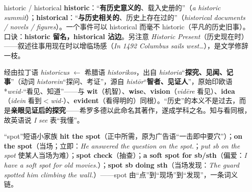 \documentclass[../main.tex]{subfiles}
\begin{document}


\begin{lex}{historic / historical}
\textbf{historic}：“\textbf{有历史意义的}、载入史册的”（\textit{a historic summit}）；\textbf{historical}：“\textbf{与历史相关的}、历史上存在过的”（\textit{historical documents / novels / figures}）。一个事件可以 historical 而毫不 historic（平凡的历史旧事）。口诀：\textbf{historic 留名，historical 沾边}。另注意 \textit{Historic Present}（历史现在时）——叙述往事用现在时以增临场感（\textit{In 1492 Columbus sails west\dots}），是文学修辞一枝。
\end{lex}

\begin{origin}
经由拉丁语 \textit{historicus} $\leftarrow$ 希腊语 \textit{historikos}，出自 \textit{historia}“\textbf{探究、见闻、记事}”（动词 \textit{historein}“探问、考证”，源自 \textit{histōr}“\textbf{智者、见证人}”，原始印欧语 *\textit{weid-}“看见、知道”——与 \textbf{wit}（机智）、\textbf{wise}、\textbf{vision}（\textit{vidēre} 看见）、\textbf{idea}（\textit{idein} 看到$<$\textit{wid-}）、\textbf{evident}（看得明的）同根）。“历史”的本义不是过去，而是\textbf{亲眼见证后的探究}——希罗多德以此命名其著作，遂成学科之名。知与看同根，故英语说 \textit{I see} 表“我懂”。
\end{origin}



\begin{gram}{“spot”短语小家族}
\textbf{hit the spot}（正中所需，原为广告语“一击即中要穴”）；\textbf{on the spot}（当场；立即：\textit{He answered the question on the spot.}；\textit{put sb on the spot} 使某人当场为难）；\textbf{spot check}（抽查）；\textbf{a soft spot for sb/sth}（偏爱：\textit{I have a soft spot for old movies.}）；\textbf{spot sb doing sth}（当场发现：\textit{The guard spotted him climbing the wall.}）——spot 由“点”到“现场”到“发现”，一条词义链。
\end{gram}

\end{document}
